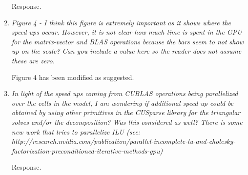 \documentclass[12pt]{article} %
\begin{document}
\begin{enumerate}
Response.

\item \textit{Figure 4 - I think this figure is extremely important as it shows where the speed ups occur. However, it is not clear how much time is spent in the GPU for the matrix-vector and BLAS operations because the bars seem to not show up on the scale? Can you include a value here so the reader does not assume these are zero. } 

Figure 4 has been modified as suggested.

\item \textit{In light of the speed ups coming from CUBLAS operations being parallelized over the cells in the model, I am wondering if additional speed up could be obtained by using other primitives in the CUSparse library for the triangular solves and/or the decomposition? Was this considered as well? There is some new work that tries to parallelize ILU (see: http://research.nvidia.com/publication/parallel-incomplete-lu-and-cholesky-factorization-preconditioned-iterative-methods-gpu) } 

Response.


\end{enumerate}
\end{document}
